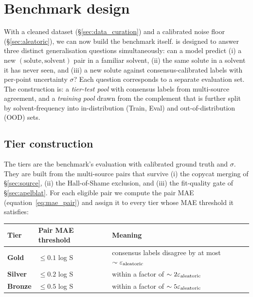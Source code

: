 \section{Benchmark design}
\label{sec:benchmark}

With a cleaned dataset (§\ref{sec:data_curation}) and a calibrated
noise floor (§\ref{sec:aleatoric}), we can now build the benchmark
itself.  \scthree{} is designed to answer three distinct generalisation
questions simultaneously: can a model predict (i) a new
$(\mathrm{solute}, \mathrm{solvent})$ pair in a familiar solvent,
(ii) the same solute in a solvent it has never seen, and
(iii) a new solute against consensus-calibrated labels with per-point
uncertainty $\sigma$?  Each question corresponds to a separate
evaluation set.  The construction is: a \emph{tier-test pool} with
consensus labels from multi-source agreement, and a \emph{training
pool} drawn from the complement that is further split by
solvent-frequency into in-distribution (Train, Eval) and
out-of-distribution (OOD) sets.

\subsection{Tier construction}
\label{sec:tiers}

The tiers are the benchmark's evaluation with calibrated ground truth
and $\sigma$.  They are built from the  multi-source pairs
that survive
(i) the copycat merging of §\ref{sec:source}, (ii) the Hall-of-Shame
exclusion, and (iii) the fit-quality gate of §\ref{sec:apelblat}.  For
each eligible pair we compute the pair MAE (equation~\ref{eq:mae_pair})
and assign it to every tier whose MAE threshold it satisfies:

\begin{center}
\renewcommand{\arraystretch}{1.08}\small
\begin{tabular}{@{}lll@{}}
\toprule
Tier   & Pair MAE threshold          & Meaning \\
\midrule
\textbf{Gold}   & $\leq 0.1$ log S    & consensus labels disagree by at most $\sim\varepsilon_{\text{aleatoric}}$ \\
\textbf{Silver} & $\leq 0.2$ log S    & within a factor of $\sim 2\varepsilon_{\text{aleatoric}}$ \\
\textbf{Bronze} & $\leq 0.5$ log S    & within a factor of $\sim 5\varepsilon_{\text{aleatoric}}$ \\
\bottomrule
\end{tabular}
\end{center}

